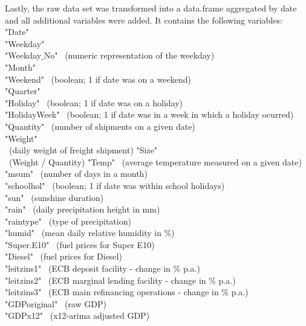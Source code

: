 \documentclass[a4paper, 11pt]{article}
\begin{document}
Lastly, the raw data set was transformed into a data.frame aggregated by date and all additional variables were added. It contains the following variables: \\
"Date"\\
"Weekday"\\ 
"Weekday$\_$No" \ (numeric representation of the weekday)\\
"Month"\\
"Weekend" \ (boolean; 1 if date was on a weekend)\\
"Quarter"\\
"Holiday" \ (boolean; 1 if date was on a holiday)\\
"HolidayWeek" \ (boolean; 1 if date was in a week in which a holiday ocurred) \\ "Quantity" \ (number of shipments on a given date)\\ 
"Weight"\\ \ (daily weight of freight shipment)
"Size" \\ \ (Weight / Quantity)
"Temp"  \ (average temperature measured on a given date)\\
"msum" \ (number of days in a month) \\
"schoolhol"  \ (boolean; 1 if date was within school holidays)\\ 
"sun" \ (sunshine duration) \\
"rain" \ (daily precipitation height in mm) \\
"raintype" \ (type of precipitation) \\
"humid" \ (mean daily relative humidity in \%) \\
"Super.E10" \ (fuel prices for Super E10) \\
"Diesel"  \ (fuel prices for Diesel)  \\
"leitzins1" \ (ECB deposit facility - change in \% p.a.) \\
"leitzins2" \ (ECB marginal lending facility - change in \% p.a.) \\
"leitzins3" \ (ECB main refinancing operations - change in \% p.a.) \\
"GDPoriginal" \ (raw GDP)\\
"GDPx12" \ (x12-arima adjusted GDP) \\
\end{document}
